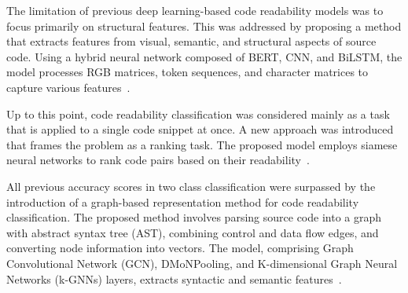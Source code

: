 \documentclass[%
class=scrreprt,
chapterprefix=false,%
open=right,%
twoside=false,%
paper=a4,%
logofile={Logo\_zentral\_farbig\_EN.png},%
thesistype=master,%
UKenglish,%
]{se2thesis}
\theoremstyle{definition}
\begin{document}
	The limitation of previous deep learning-based code readability models was to focus primarily on structural features. This was addressed by proposing a method that extracts features from visual, semantic, and structural aspects of source code. Using a hybrid neural network composed of BERT, CNN, and BiLSTM, the model processes RGB matrices, token sequences, and character matrices to capture various features~\cite{mi2022towards}.
	
	Up to this point, code readability classification was considered mainly as a task that is applied to a single code snippet at once. A new approach was introduced that frames the problem as a ranking task. The proposed model employs siamese neural networks to rank code pairs based on their readability~\cite{mi2022rank}.

	All previous accuracy scores in two class classification were surpassed by the introduction of a graph-based representation method for code readability classification. The proposed method involves parsing source code into a graph with abstract syntax tree (AST), combining control and data flow edges, and converting node information into vectors. The model, comprising Graph Convolutional Network (GCN), DMoNPooling, and K-dimensional Graph Neural Networks (k-GNNs) layers, extracts syntactic and semantic features~\cite{mi2023graph}.
\end{document}
